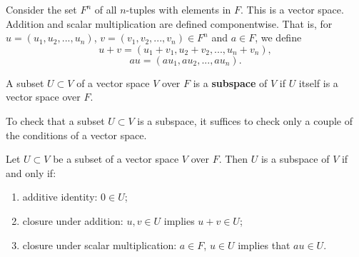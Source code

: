 \documentclass[12pt]{book}
\begin{document}
\begin{examp}\label{exp:vs12}
      Consider the set $F^n$ of all $n$-tuples with elements in $F$. This is a vector space. Addition and scalar multiplication are
	  defined componentwise. That is, for $u = (u_1, u_2, ... , u_n)$, $v = (v_1, v_2, . . . , v_n) \in F^n$ and $a \in F$, we define
	  $$u + v = (u_1 + v_1, u_2 + v_2, . . . , u_n + v_n),$$
	  $$au = (au_1, au_2, . . . , au_n).$$      
\end{examp}


\begin{defi}\label{def:vcs_2}	
      A subset $U \subset V$ of a vector space $V$ over $F$ is a \textbf{subspace} of $V$ if $U$ itself is a vector space over $F$.
\end{defi}	

To check that a subset $U \subset V$ is a subspace, it suffices to check only a couple of the conditions of a vector space.		  
\begin{lem}\label{lem::vcs}
      Let $U \subset V$ be a subset of a vector space $V$ over $F$. Then $U$ is a subspace of $V$ if and only if:
	  \begin{enumerate}
	       \item additive identity: $0 \in U$;
		   \item closure under addition: $u, v \in U$ implies $u + v \in U$;
		   \item closure under scalar multiplication: $a \in F$, $u \in U$ implies that $au \in U$.
	  \end{enumerate}
\end{lem}
\end{document}
